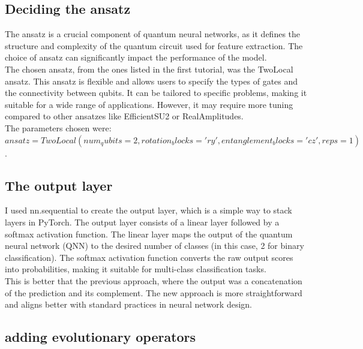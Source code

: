 \documentclass[conference]{IEEEtran}
\begin{document}
\subsection*{\fontsize{12}{16}\selectfont Deciding the ansatz}

The ansatz is a crucial component of quantum neural networks, as it defines the structure and complexity of the quantum circuit used for feature extraction. The choice of ansatz can significantly impact the performance of the model.\\
The chosen ansatz, from the ones listed in the first tutorial, was the TwoLocal ansatz. This ansatz is flexible and allows users to specify the types of gates and the connectivity between qubits. It can be tailored to specific problems, making it suitable for a wide range of applications. However, it may require more tuning compared to other ansatzes like EfficientSU2 or RealAmplitudes.\\
The parameters chosen were:$ansatz = TwoLocal(num_qubits=2, rotation_blocks='ry', entanglement_blocks='cz', reps=1)$.



\subsection*{\fontsize{12}{16}\selectfont The output layer}

I used nn.sequential to create the output layer, which is a simple way to stack layers in PyTorch. The output layer consists of a linear layer followed by a softmax activation function. The linear layer maps the output of the quantum neural network (QNN) to the desired number of classes (in this case, 2 for binary classification). The softmax activation function converts the raw output scores into probabilities, making it suitable for multi-class classification tasks.\\
This is better that the previous approach, where the output was a concatenation of the prediction and its complement. The new approach is more straightforward and aligns better with standard practices in neural network design.


\subsection*{\fontsize{12}{16}\selectfont adding evolutionary operators}
\end{document}
